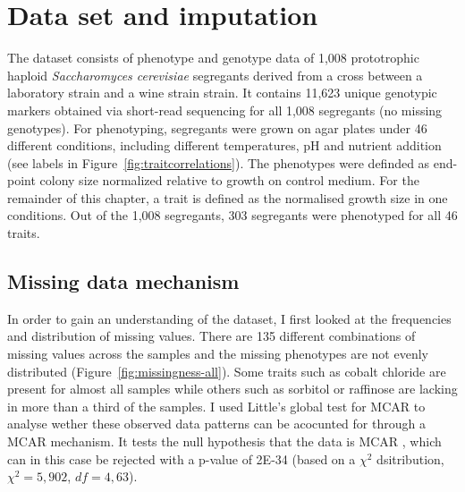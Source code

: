 \section{Data set and imputation}
The dataset consists of phenotype and genotype data of 1,008 prototrophic haploid \emph{Saccharomyces cerevisiae} segregants derived from a cross between a laboratory strain and a wine strain strain. It contains 11,623 unique genotypic markers obtained via short-read sequencing for all 1,008 segregants (no missing genotypes). For phenotyping, segregants were grown on agar plates under 46 different conditions, including different temperatures, pH and nutrient addition (see labels in Figure~\ref{fig:traitcorrelations}). The phenotypes were definded as end-point colony size normalized relative to growth on control medium. For the remainder of this chapter, a trait is defined as the normalised growth size in one conditions. Out of the 1,008 segregants, 303 segregants were phenotyped for all 46 traits.

\subsection{Missing data mechanism} 
In order to gain an understanding of the dataset, I first looked at the frequencies and distribution of missing values. There are 135 different combinations of missing values across the samples and the missing phenotypes are not evenly distributed (Figure~\ref{fig:missingness-all}). Some traits such as cobalt chloride are present for almost all samples while others such as sorbitol or raffinose are lacking in more than a third of the samples. I used Little's global test for MCAR to analyse wether these observed data patterns can be acocunted for through a MCAR mechanism. It tests the null hypothesis that the data is MCAR \citep{Little1988,Beaujean2015}, which can in this case be rejected with a p-value of 2E-34 (based on a \(\chi^2\) dsitribution, \(\chi^2=5,902\), \(df=4,63\)). 

